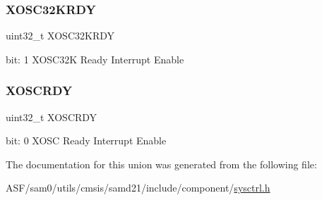 \subsubsection{\texorpdfstring{XOSC32KRDY}{XOSC32KRDY}}
{\footnotesize\ttfamily uint32\+\_\+t X\+O\+S\+C32\+K\+R\+DY}

bit\+: 1 X\+O\+S\+C32K Ready Interrupt Enable \mbox{\label{union_s_y_s_c_t_r_l___i_n_t_e_n_c_l_r___type_ae3f4eaf046b9b3a9346c0d1d2d91cc06}} 
\subsubsection{\texorpdfstring{XOSCRDY}{XOSCRDY}}
{\footnotesize\ttfamily uint32\+\_\+t X\+O\+S\+C\+R\+DY}

bit\+: 0 X\+O\+SC Ready Interrupt Enable 

The documentation for this union was generated from the following file\+:\begin{DoxyCompactItemize}
\item 
A\+S\+F/sam0/utils/cmsis/samd21/include/component/\mbox{\hyperlink{component_2sysctrl_8h}{sysctrl.\+h}}\end{DoxyCompactItemize}
